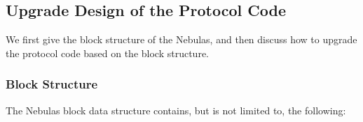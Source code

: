 \subsection{Upgrade Design of the Protocol Code}

We first give the block structure of the Nebulas, and then discuss how to upgrade the protocol code based on the block structure.


\subsubsection{Block Structure}

The Nebulas block data structure contains, but is not limited to, the following:

